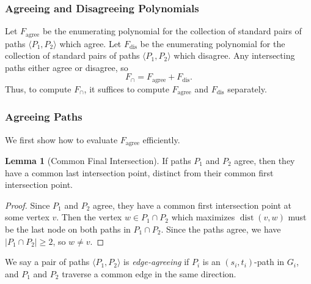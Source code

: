 \documentclass[11pt]{article}
\DeclareMathOperator{\dist}{dist}
\newcommand{\agree}{\text{agree}}
\newcommand{\Fagree}{F_{\agree}}
\newcommand{\Frev}{F_{\text{dis}}}
\theoremstyle{definition}
\newtheorem{lemma}[theorem]{Lemma}
\begin{document}
\subsubsection*{Agreeing and Disagreeing Polynomials}

Let $\Fagree$ be the enumerating polynomial for the collection of standard pairs of paths $\langle P_1, P_2\rangle$ which agree.
Let $\Frev$ be the enumerating polynomial for the collection of standard pairs of paths $\langle P_1, P_2\rangle$ which disagree.
Any intersecting paths either agree or disagree, so
\begin{equation}
    \label{agree-taut}
    F_{\cap} = \Fagree + \Frev.
\end{equation}
Thus, to compute $F_{\cap}$, it suffices to compute $\Fagree$ and $\Frev$ separately.

\subsubsection*{Agreeing Paths}

We first show how to evaluate $\Fagree$ efficiently.

\begin{lemma}[Common Final Intersection] 
\label{last-intersection}
If paths $P_1$ and $P_2$ agree, then they have a common last intersection point, distinct from their common first intersection point.
\end{lemma}
\begin{proof}
    Since $P_1$ and $P_2$ agree, they have a common first intersection point at some vertex $v$.
    Then the vertex $w\in P_1\cap P_2$ which maximizes $\dist(v,w)$ must be the last node on both paths in $P_1\cap P_2$.
    Since the paths agree, we have $|P_1\cap P_2|\ge 2$, so $w\neq v$.
\end{proof}

\noindent We say a pair of paths $\langle P_1,P_2\rangle$ is \emph{edge-agreeing} if $P_i$ is an $(s_i,t_i)$-path in $G_i$, and $P_1$ and $P_2$ traverse a common edge in the same direction.
\end{document}
